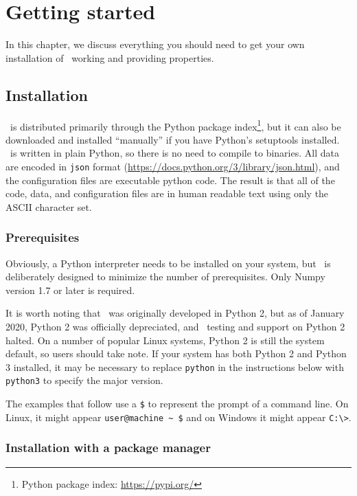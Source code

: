 \chapter{Getting started}\label{ch:start}

In this chapter, we discuss everything you should need to get your own installation of \PM\ working and providing properties.

\section{Installation}

\PM\ is distributed primarily through the Python package index\footnote{Python package index: \url{https://pypi.org/}}, but it can also be downloaded and installed ``manually'' if you have Python's setuptools installed.  \PM\ is written in plain Python, so there is no need to compile to binaries.  All data are encoded in \texttt{json} format (\url{https://docs.python.org/3/library/json.html}), and the configuration files are executable python code.  The result is that all of the code, data, and configuration files are in human readable text using only the ASCII character set.

\subsection{Prerequisites}

Obviously, a Python interpreter needs to be installed on your system, but \PM\ is deliberately designed to minimize the number of prerequisites.  Only Numpy version 1.7 or later is required.

It is worth noting that \PM\ was originally developed in Python 2, but as of January 2020, Python 2 was officially depreciated, and \PM\ testing and support on Python 2 halted.  On a number of popular Linux systems, Python 2 is still the system default, so users should take note.  If your system has both Python 2 and Python 3 installed, it may be necessary to replace \texttt{python} in the instructions below with \texttt{python3} to specify the major version.

The examples that follow use a \verb|$| to represent the prompt of a command line.  On Linux, it might appear \verb|user@machine ~ $| and on Windows it might appear \verb|C:\>|.  

\subsection{Installation with a package manager}

